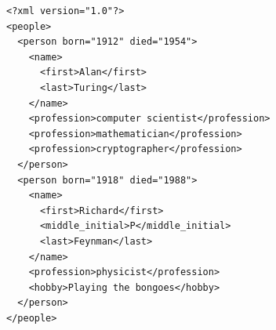 \begin{frame}[fragile]

\lstset{language=XPath}

\hspace*{-2em}
\end{frame}


\newsavebox\personXML
\begin{lrbox}{\personXML}
\begin{lstlisting}[style=markup]
<?xml version="1.0"?>
<people>
  <person born="1912" died="1954">
    <name>
      <first>Alan</first>
      <last>Turing</last>
    </name>
    <profession>computer scientist</profession>
    <profession>mathematician</profession>
    <profession>cryptographer</profession>
  </person>
  <person born="1918" died="1988">
    <name>
      <first>Richard</first>
      <middle_initial>P</middle_initial>
      <last>Feynman</last>
    </name>
    <profession>physicist</profession>
    <hobby>Playing the bongoes</hobby>
  </person>
</people>
\end{lstlisting}
\end{lrbox}


